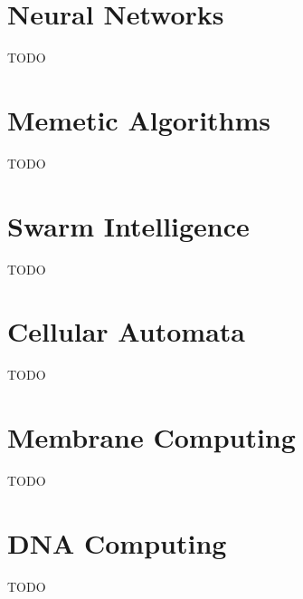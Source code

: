 \documentclass[a4paper]{article}
\begin{document}
\section{Neural Networks}
\label{sec:nn}

TODO

\section{Memetic Algorithms}
\label{sec:ma}

TODO

\section{Swarm Intelligence}
\label{sec:swarm}

TODO

\section{Cellular Automata}
\label{sec:ca}

TODO

\section{Membrane Computing}
\label{sec:membrane}

TODO

\section{DNA Computing}
\label{sec:dna}

TODO
\end{document}
